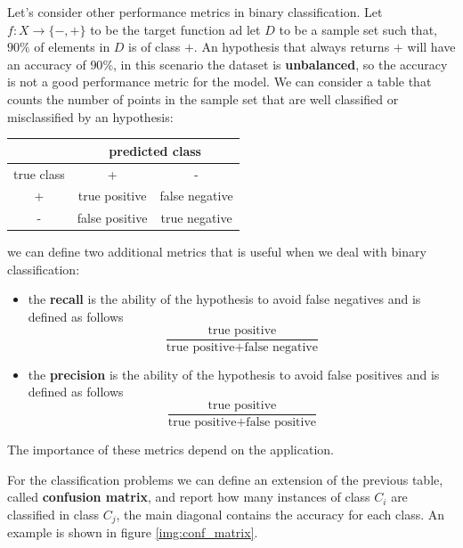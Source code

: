 \documentclass[10pt, letterpaper]{report}
\begin{document}
Let's consider other performance metrics in binary classification. Let $f:X\rightarrow\{-,+\}$ to be the target function ad let $D$ to be a sample set such that, $90\%$ of elements in $D$ is of class $+$. An hypothesis that always returns $+$ will have an accuracy of $90\%$, in this scenario the dataset is \textbf{unbalanced}, so the accuracy is not a good performance metric for the model. We can consider a table that counts the number of points in the sample set that are well classified or misclassified by an hypothesis:
\begin{center}
	\begin{tabular}{c|cc|}
		\cline{2-3}
		                                 & \multicolumn{2}{c|}{predicted class}                  \\ \hline
		\multicolumn{1}{|c|}{true class} & \multicolumn{1}{c|}{+}               & -              \\ \hline
		\multicolumn{1}{|c|}{+}          & \multicolumn{1}{c|}{true positive}   & false negative \\ \hline
		\multicolumn{1}{|c|}{-}          & \multicolumn{1}{c|}{false positive}  & true negative  \\ \hline
	\end{tabular}
\end{center}
we can define two additional metrics that is useful when we deal with binary classification:\begin{itemize}
	\item the \textbf{recall} is the ability of the hypothesis to avoid false negatives and is defined as follows\begin{equation}
		      \frac{\text{true positive}}{\text{true positive}+\text{false negative}}
	      \end{equation}
	\item the \textbf{precision} is the ability of the hypothesis to avoid false positives and is defined as follows\begin{equation}
		      \frac{\text{true positive}}{\text{true positive}+\text{false positive}}
	      \end{equation}
\end{itemize}
The importance of these metrics depend on the application.

\newpage
For the classification problems we can define an extension of the previous table, called \textbf{confusion matrix}, and report how many instances of class $C_i$ are classified in class $C_j$, the main diagonal contains the accuracy for each class. An example is shown in figure \ref{img:conf_matrix}.
\end{document}
